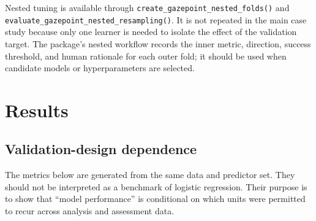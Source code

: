 \begin{table}
\centering
\caption{\label{tab:grouped-workflow-code}Participant-grouped workflow audit.}
\centering
{}
\end{table}

Nested tuning is available through \texttt{create\_gazepoint\_nested\_folds()} and \texttt{evaluate\_gazepoint\_nested\_resampling()}. It is not repeated in the main case study because only one learner is needed to isolate the effect of the validation target. The package's nested workflow records the inner metric, direction, success threshold, and human rationale for each outer fold; it should be used when candidate models or hyperparameters are selected.

\section{Results}\label{results}

\subsection{Validation-design dependence}\label{validation-design-dependence}

The metrics below are generated from the same data and predictor set. They should not be interpreted as a benchmark of logistic regression. Their purpose is to show that ``model performance'' is conditional on which units were permitted to recur across analysis and assessment data.

